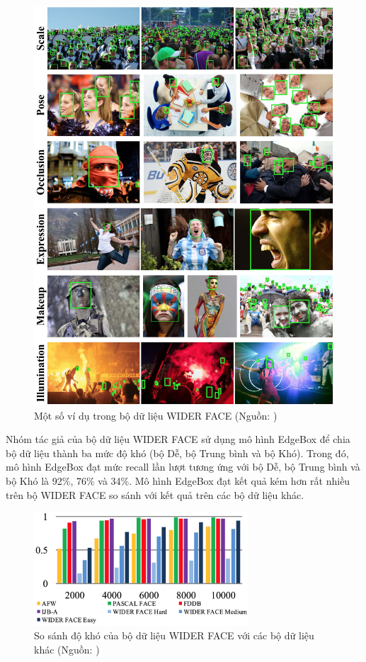 {    \begin{figure}[H]
        \centering
        \includegraphics[width=12cm] {images/widerface_examples}
        \caption{Một số ví dụ trong bộ dữ liệu WIDER FACE (Nguồn: \cite{yang2016wider})}
        \label{fig:widerface_examples}
    \end{figure}

    \noindent
    Nhóm tác giả của bộ dữ liệu WIDER FACE sử dụng mô hình EdgeBox \cite{zitnick2014edge} để chia bộ dữ liệu thành ba mức độ khó (bộ Dễ, bộ Trung bình và bộ Khó).
    Trong đó, mô hình EdgeBox đạt mức recall lần lượt tương ứng với bộ Dễ, bộ Trung bình và bộ Khó là 92\%, 76\% và 34\%.
    Mô hình EdgeBox đạt kết quả kém hơn rất nhiều trên bộ WIDER FACE so sánh với kết quả trên các bộ dữ liệu khác.

    \begin{figure}[H]
        \centering
        \includegraphics[width=8cm] {images/widerface_compare_2}
        \caption{So sánh độ khó của bộ dữ liệu WIDER FACE với các bộ dữ liệu khác (Nguồn: \cite{yang2016wider})}
        \label{fig:widerface_compare_2}
    \end{figure}

}
